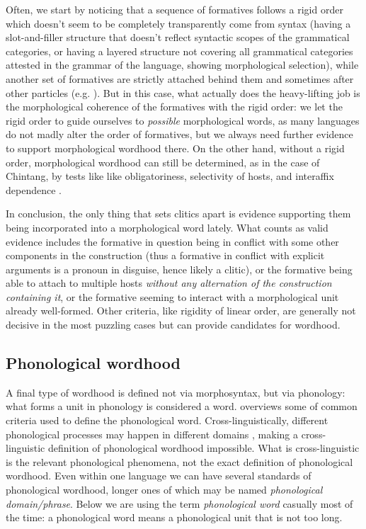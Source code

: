 \documentclass[a4paper, oneside, scheme=plain, 12pt]{article}
\newcommand*{\citesec}[1]{\S~{#1}}
\newcommand*{\citepage}[1]{p.~{#1}}
\newcommand*{\term}[1]{\emph{#1}}
\begin{document}
Often, we start by noticing that a sequence of formatives follows a rigid order
which doesn't seem to be completely transparently come from syntax
(having a slot-and-filler structure that doesn't reflect syntactic scopes of the grammatical categories, or having a layered structure not covering all grammatical categories attested in the grammar of the language, showing morphological selection),
while another set of formatives are strictly attached behind them and sometimes after other particles
(e.g. \citealt[\citesec{11.6.2}]{jacques2021grammar}).
But in this case, what actually does the heavy-lifting job
is the morphological coherence of the formatives with the rigid order:
we let the rigid order to guide ourselves to \emph{possible} morphological words,
as many languages do not madly alter the order of formatives,
but we always need further evidence to support morphological wordhood there.
On the other hand, without a rigid order,
morphological wordhood can still be determined,
as in the case of Chintang, by tests like like obligatoriness, selectivity of hosts, and interaffix dependence \citep{bickel2007free}.

In conclusion, the only thing that sets clitics apart is evidence supporting
them being incorporated into a morphological word lately.
What counts as valid evidence includes 
the formative in question being in conflict with some other components in the construction
(thus a formative in conflict with explicit arguments is a pronoun in disguise,
hence likely a clitic),
or the formative being able to attach to multiple hosts
\emph{without any alternation of the construction containing it},
or the formative seeming to interact with a morphological unit already well-formed.
Other criteria, like rigidity of linear order,
are generally not decisive in the most puzzling cases
but can provide candidates for wordhood.

\subsection{Phonological wordhood}\label{sec:phonological}

A final type of wordhood is defined not via morphosyntax, but via phonology:
what forms a unit in phonology is considered a word.
\citet[\citesec{10.3}]{dixon2010basic2} overviews some of common criteria used to define the phonological word.
Cross-linguistically, different phonological processes may happen in different domains \citep[\citepage{62}]{schackow2015grammar},
making a cross-linguistic definition of phonological wordhood impossible.
What is cross-linguistic is the relevant phonological phenomena,
not the exact definition of phonological wordhood.
Even within one language we can have several standards of phonological wordhood,
longer ones of which may be named \term{phonological domain/phrase}.
Below we are using the term \term{phonological word} casually most of the time:
a phonological word means a phonological unit that is not too long.
\end{document}
